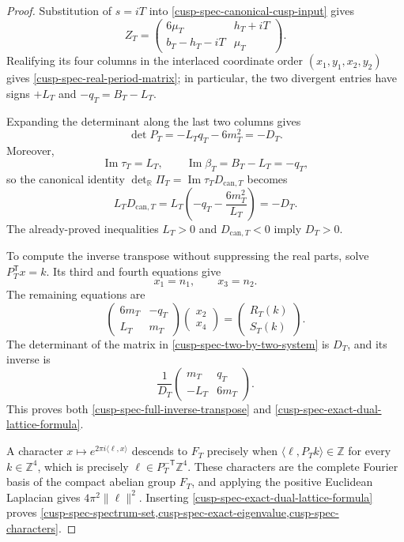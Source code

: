 \begin{proof}
Substitution of \(s=iT\) into
\cref{cusp-spec-canonical-cusp-input} gives
\[
 Z_T=
 \begin{pmatrix}
  6\mu_T&h_T+iT\\ b_T-h_T-iT&\mu_T
 \end{pmatrix}.
\]
Realifying its four columns in the interlaced coordinate order
\((x_1,y_1,x_2,y_2)\) gives
\cref{cusp-spec-real-period-matrix}; in particular, the two divergent entries
have signs \(+L_T\) and \(-q_T=B_T-L_T\).

Expanding the determinant along the last two columns gives
\[
 \det P_T=-L_Tq_T-6m_T^2=-D_T.
\]
Moreover,
\[
 \operatorname{Im}\tau_T=L_T,
 \qquad \operatorname{Im}\beta_T=B_T-L_T=-q_T,
\]
so the canonical identity
\(\det_{\mathbb R}\Pi_T=\operatorname{Im}\tau_TD_{\mathrm{can},T}\)
becomes
\[
 L_TD_{\mathrm{can},T}
 =L_T\left(-q_T-\frac{6m_T^2}{L_T}\right)=-D_T.
\]
The already-proved inequalities \(L_T>0\) and
\(D_{\mathrm{can},T}<0\) imply \(D_T>0\).

To compute the inverse transpose without suppressing the real parts, solve
\(P_T^{\mathsf T}x=k\).  Its third and fourth equations give
\[
 x_1=n_1,\qquad x_3=n_2.
\]
The remaining equations are
\begin{equation}
 \begin{pmatrix}6m_T&-q_T\\L_T&m_T\end{pmatrix}
 \begin{pmatrix}x_2\\x_4\end{pmatrix}
 =\begin{pmatrix}R_T(k)\\S_T(k)\end{pmatrix}.
 \label{cusp-spec-two-by-two-system}
\end{equation}
The determinant of the matrix in
\cref{cusp-spec-two-by-two-system} is \(D_T\), and its inverse is
\[
 \frac1{D_T}
 \begin{pmatrix}m_T&q_T\\-L_T&6m_T\end{pmatrix}.
\]
This proves both \cref{cusp-spec-full-inverse-transpose} and
\cref{cusp-spec-exact-dual-lattice-formula}.

A character \(x\mapsto e^{2\pi i\langle\ell,x\rangle}\) descends to
\(F_T\) precisely when
\(\langle\ell,P_Tk\rangle\in\mathbb Z\) for every
\(k\in\mathbb Z^4\), which is precisely
\(\ell\in P_T^{-\mathsf T}\mathbb Z^4\).  These characters are the complete
Fourier basis of the compact abelian group \(F_T\), and applying the positive
Euclidean Laplacian gives \(4\pi^2\lVert\ell\rVert^2\).  Inserting
\cref{cusp-spec-exact-dual-lattice-formula} proves
\cref{cusp-spec-spectrum-set,cusp-spec-exact-eigenvalue,cusp-spec-characters}.
\end{proof}

